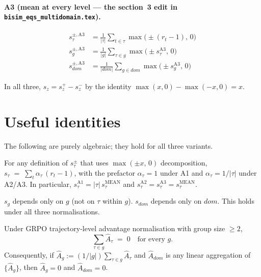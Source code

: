 \documentclass[11pt]{article}
\newcommand{\smean}{s^{\text{MEAN}}}
\begin{document}
\paragraph{A3 (mean at every level --- the section~3 edit in \texttt{bisim\_eqs\_multidomain.tex}).}
\begin{align*}
s_\tau^{\pm,\text{A3}}    &= \frac{1}{|\tau|}\sum_{t\in\tau}\max\bigl(\pm(r_t-1),\,0\bigr) \\
s_g^{\pm,\text{A3}}       &= \frac{1}{|g|}\sum_{\tau\in g}\max\bigl(\pm s_\tau^{\text{A3}},\,0\bigr) \\
s_{dom}^{\pm,\text{A3}}   &= \frac{1}{|dom|}\sum_{g\in dom}\max\bigl(\pm s_g^{\text{A3}},\,0\bigr)
\end{align*}

In all three, $s_z = s_z^+ - s_z^-$ by the identity $\max(x,0)-\max(-x,0)=x$.

\section{Useful identities}
\label{sec:identities}

The following are purely algebraic; they hold for all three variants.

\begin{lemma}
\label{lem:tau}
For any definition of $s_\tau^\pm$ that uses $\max(\pm x,\,0)$ decomposition,
$s_\tau \;=\; \sum_t\alpha_\tau\,(r_t-1)$, with the prefactor
$\alpha_\tau = 1$ under A1 and $\alpha_\tau = 1/|\tau|$ under A2/A3.
In particular, $s_\tau^{\text{A1}} = |\tau|\,\smean_\tau$ and
$s_\tau^{\text{A2}} = s_\tau^{\text{A3}} = \smean_\tau$.
\end{lemma}

\begin{lemma}
\label{lem:const}
$s_g$ depends only on $g$ (not on $\tau$ within $g$). $s_{dom}$ depends
only on $dom$. This holds under all three normalisations.
\end{lemma}

\begin{lemma}
\label{lem:grpo}
Under GRPO trajectory-level advantage normalisation with group size
$\geq 2$,
\[
\sum_{\tau\in g}\hat A_\tau \;=\; 0 \quad\text{for every }g.
\]
Consequently, if $\hat A_g := (1/|g|)\sum_{\tau\in g}\hat A_\tau$ and
$\hat A_{dom}$ is any linear aggregation of $\{\hat A_g\}$, then
$\hat A_g = 0$ and $\hat A_{dom}=0$.
\end{lemma}
\end{document}
